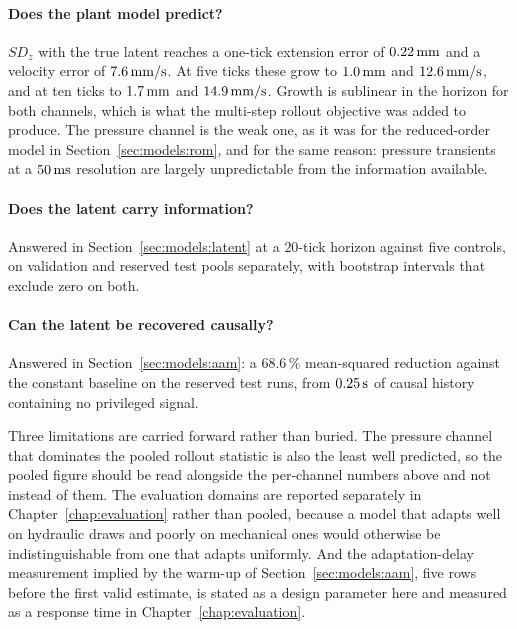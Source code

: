 \paragraph{Does the plant model predict?}
$SD_z$ with the true latent reaches a one-tick extension error of
$\unit[0.22]{mm}$ and a velocity error of $\unit[7.6]{mm/s}$. At five ticks
these grow to $\unit[1.0]{mm}$ and $\unit[12.6]{mm/s}$, and at ten ticks to
$\unit[1.7]{mm}$ and $\unit[14.9]{mm/s}$. Growth is sublinear in the horizon
for both channels, which is what the multi-step rollout objective was added to
produce. The pressure channel is the weak one, as it was for the reduced-order
model in Section~\ref{sec:models:rom}, and for the same reason:
pressure transients at a $\unit[50]{ms}$ resolution are largely unpredictable
from the information available.

\paragraph{Does the latent carry information?}
Answered in Section~\ref{sec:models:latent} at a $20$-tick horizon against
five controls, on validation and reserved test pools separately, with
bootstrap intervals that exclude zero on both.

\paragraph{Can the latent be recovered causally?}
Answered in Section~\ref{sec:models:aam}: a $68.6\,\%$ mean-squared reduction
against the constant baseline on the reserved test runs, from
$\unit[0.25]{s}$ of causal history containing no privileged signal.

Three limitations are carried forward rather than buried. The pressure channel
that dominates the pooled rollout statistic is also the least well predicted,
so the pooled figure should be read alongside the per-channel numbers above and
not instead of them. The evaluation domains are reported separately in
Chapter~\ref{chap:evaluation} rather than pooled, because a model that adapts
well on hydraulic draws and poorly on mechanical ones would otherwise be
indistinguishable from one that adapts uniformly. And the adaptation-delay
measurement implied by the warm-up of Section~\ref{sec:models:aam}, five rows
before the first valid estimate, is stated as a design parameter here and
measured as a response time in Chapter~\ref{chap:evaluation}.

